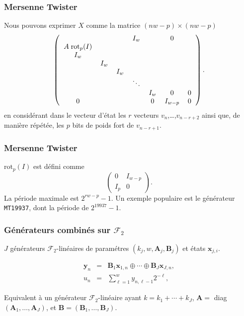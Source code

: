 \documentclass[t,usepdftitle=false]{beamer}
\def\bx{\boldsymbol{x}}
\def\by{\boldsymbol{y}}
\def\bA{\boldsymbol{A}}
\def\bB{\boldsymbol{B}}
\begin{document}
\begin{frame}
\frametitle{Mersenne Twister}

Nous pouvons exprimer $X$ comme la matrice $(nw-p)\times(nw-p)$
\begin{eqnarray*}
\left(
\begin{tabular}{ccccccc}
   &        &       &  $I_w$ &     & 0 \\ $A\;\mbox{rot}_p(I)$ \\
$I_w$&      &       &        &     &    \\
   &  $I_w$ &       &        &     &    \\
   &        & $I_w$ &        &     &    \\
   &        &       &$\ddots$&     &    \\
   &        &       &        &$I_w$& 0  & 0\\
 0 &        &       &        &  0  & $I_{w-p}$ & 0 \\
\end{tabular}
\right).
\end {eqnarray*}
en considérant dans le vecteur d'état les $r$ vecteurs
$v_n$,\ldots,$v_{n-r+2}$ ainsi que, de manière répétée, les $p$ bits de
poids fort de $v_{n-r+1}$.

\end{frame}

\begin{frame}
\frametitle{Mersenne Twister}

$\mbox{rot}_p(I)$ est défini comme
\[
\begin{pmatrix}
0 & I_{w-p} \\ I_p & 0
\end{pmatrix}.
\]
La période maximale est $2^{rw-p}-1$.
Un exemple populaire est le générateur {\tt MT19937}, dont la période
de $2^{19937}-1$.

\end{frame}

\begin{frame}
\frametitle{Générateurs combinés sur $\mathcal{F}_2$}

${J}$ générateurs $\mathcal{F}_2$-linéaires de paramétres 
$(k_j, w, \bA_j, \bB_j)$ et états $\bx_{j,i}$.

\mbox{}

\begin{eqnarray*}
 \by_n &=& \bB_1\bx_{1,n} \oplus \cdots \oplus\bB_J\bx_{J,n},
                                                   \label{eq:comba}\\
 u_n   &=& \sum_{\ell=1}^w y_{n,\ell-1} 2^{-\ell}, \label{eq:combb}
\end{eqnarray*}

\mbox{}

Equivalent à un générateur $\mathcal{F}_2$-linéaire 
ayant $k=k_1 + \cdots + k_J$, $\bA =$ diag$(\bA_1,\dots,\bA_J)$, 
et $\bB = (\bB_1,\dots, \bB_J)$.

\end{frame}
\end{document}
